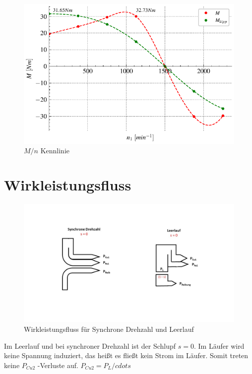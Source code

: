 \documentclass[conference]{IEEEtran}
\begin{document}
\begin{figure}[htbp]
    \centering
    \includegraphics[width=\columnwidth]{./figures/m_n-kennlinie.pdf}
    \caption{$M/n$ Kennlinie}
    \label{fig:m_n-kennlinie}
\end{figure}


\section{Wirkleistungsfluss}

\begin{figure}[htbp]
    \centering
    \includegraphics[width=\columnwidth]{./figures/Wirkleistungsfluss.jpg}
    \caption{Wirkleistungsfluss für Synchrone Drehzahl und Leerlauf}
\end{figure}

Im Leerlauf und bei synchroner Drehzahl ist der Schlupf $s=0$. Im Läufer wird keine Spannung
induziert, das heißt es fließt kein Strom im Läufer. Somit treten keine $P_{Cu2}$ -Verluste auf. 
$P_{Cu2} = P_{L} /cdot s$ 
\end{document}
